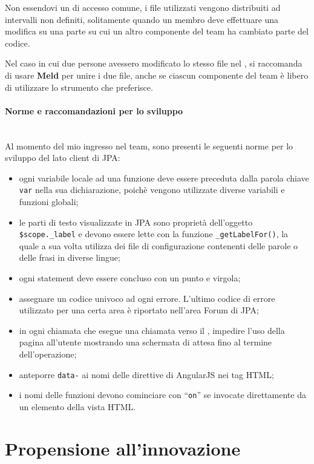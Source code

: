 Non essendovi un  di accesso comune, i file utilizzati vengono
distribuiti ad intervalli non definiti, solitamente quando un membro deve
effettuare una modifica su una parte su cui un altro componente del team ha
cambiato parte del codice.

Nel caso in cui due persone avessero modificato lo stesso file nel \FREND{}, si
raccomanda di usare \textbf{Meld} per unire i due file, anche se ciascun
componente del team è libero di utilizzare lo strumento che preferisce.

\paragraph{Norme e raccomandazioni per lo sviluppo} \mbox{} \\

Al momento del mio ingresso nel team, sono presenti le seguenti norme per lo
sviluppo del lato client di JPA:

\begin{itemize}
\item ogni variabile locale ad una funzione deve essere preceduta dalla parola
chiave \texttt{var} nella sua dichiarazione, poichè vengono utilizzate diverse
variabili e funzioni globali;
\item le parti di testo visualizzate in JPA sono proprietà dell'oggetto
\texttt{\$scope.\_label} e devono essere lette con la funzione
\texttt{\_getLabelFor()}, la quale a sua volta utilizza dei file di
configurazione contenenti delle parole o delle frasi in diverse lingue;
\item ogni statement deve essere concluso con un punto e virgola;
\item assegnare un codice univoco ad ogni errore. L'ultimo codice di errore
utilizzato per una certa area è riportato nell'area Forum di JPA;
\item in ogni chiamata che esegue una chiamata  verso il \BKEND{},
impedire l'uso della pagina all'utente  mostrando una schermata di attesa fino
al termine dell'operazione;
\item anteporre \texttt{data-} ai nomi delle direttive di AngularJS nei tag
HTML;
\item i nomi delle funzioni devono cominciare con ``\texttt{on}'' se invocate
direttamente da un elemento della vista HTML.
\end{itemize}

\section{Propensione all'innovazione}

